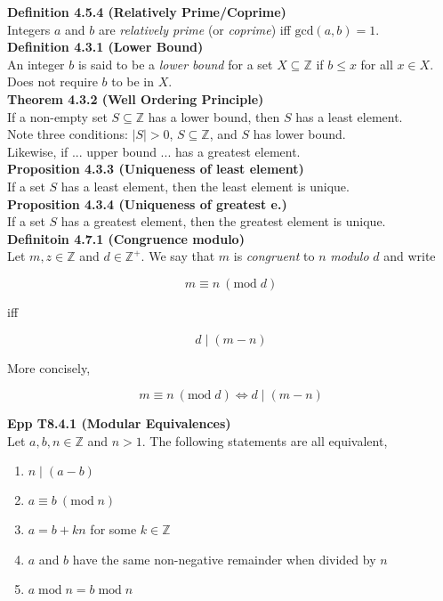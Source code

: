 \documentclass[a4paper]{article}
\newcommand{\subheading}[1]{{\scriptsize\textbf{#1}}}
\begin{document}
\begin{multicols*}{4}
\subheading{Definition 4.5.4 (Relatively Prime/Coprime)}\\
Integers $a$ and $b$ are \textit{relatively prime} (or \textit{coprime}) iff
$\mathrm{gcd}(a,b)=1$.\\

\subheading{Definition 4.3.1 (Lower Bound)}\\
An integer $b$ is said to be a \textit{lower bound} for a set $X \subseteq
\mathbb{Z}$ if $b \leq x$ for all $x \in X$.\\

Does not require $b$ to be in $X$.\\

\subheading{Theorem 4.3.2 (Well Ordering Principle)}\\
If a non-empty set $S \subseteq \mathbb{Z}$ has a lower bound, then $S$ has a
least element.\\

Note three conditions: $|S| > 0$, $S \subseteq \mathbb{Z}$, and $S$ has lower
bound.\\

Likewise, if ... upper bound ... has a greatest element.\\

\subheading{Proposition 4.3.3 (Uniqueness of least element)}\\
If a set $S$ has a least element, then the least element is unique.\\

\subheading{Proposition 4.3.4 (Uniqueness of greatest e.)}\\
If a set $S$ has a greatest element, then the greatest element is unique.\\

\subheading{Definitoin 4.7.1 (Congruence modulo)}\\
Let $m, z \in \mathbb{Z}$ and $d \in \mathbb{Z}^+$. We say that $m$ is
\textit{congruent} to $n$ \textit{modulo} $d$ and write

$$ m \equiv n\ (\mathrm{mod}\; d) $$

iff

$$ d\;|\;(m-n) $$

More concisely,

$$ m \equiv n\ (\mathrm{mod}\; d) \iff d\;|\;(m-n) $$

\subheading{Epp T8.4.1 (Modular Equivalences)}\\
Let $a, b, n \in \mathbb{Z}$ and $n > 1$. The following statements are all
equivalent,
\begin{enumerate} \itemsep -0.5em
	\item $n\;|\;(a-b)$
	\item $a \equiv b\ (\mathrm{mod}\; n)$
	\item $a = b + kn$ for some $k \in \mathbb{Z}$
	\item $a$ and $b$ have the same non-negative remainder when divided by $n$
	\item $a\;\mathrm{mod}\;n = b\;\mathrm{mod}\;n$
\end{enumerate}


\end{multicols*}
\end{document}
